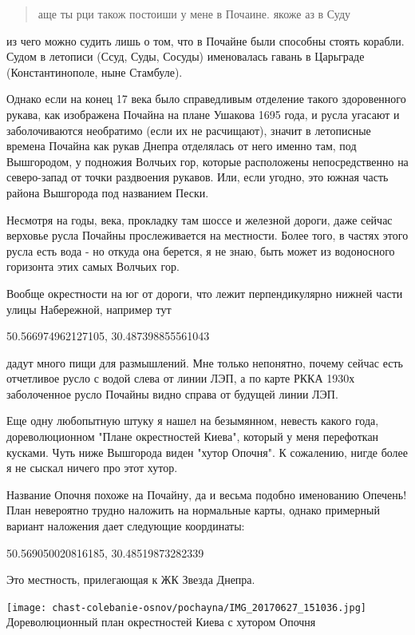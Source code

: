 \begin{quotation}
аще ты рци також постоиши у мене в Почаине. якоже аз в Суду
\end{quotation}

из чего можно судить лишь о том, что в Почайне были способны стоять корабли. Судом в летописи (Ссуд, Суды, Сосуды) именовалась гавань в Царьграде (Константинополе, ныне Стамбуле).

Однако если на конец 17 века было справедливым отделение такого здоровенного рукава, как изображена Почайна на плане Ушакова 1695 года, и русла угасают и заболочиваются необратимо (если их не расчищают), значит в летописные времена Почайна как рукав Днепра отделялась от него именно там, под Вышгородом, у подножия Волчьих гор, которые расположены непосредственно на северо-запад от точки раздвоения рукавов. Или, если угодно, это южная часть района Вышгорода под названием Пески.

Несмотря на годы, века, прокладку там шоссе и железной дороги, даже сейчас верховье русла Почайны прослеживается на местности. Более того, в частях этого русла есть вода - но откуда она берется, я не знаю, быть может из водоносного горизонта этих самых Волчьих гор. 

Вообще окрестности на юг от дороги, что лежит перпендикулярно нижней части улицы Набережной, например тут

50.566974962127105, 30.487398855561043

дадут много пищи для размышлений. Мне только непонятно, почему сейчас есть отчетливое русло с водой слева от линии ЛЭП, а по карте РККА 1930х заболоченное русло Почайны видно справа от будущей линии ЛЭП.

Еще одну любопытную штуку я нашел на безымянном, невесть какого года, дореволюционном "Плане окрестностей Киева", который у меня перефоткан кусками. Чуть ниже Вышгорода виден "хутор Опочня". К сожалению, нигде более я не сыскал ничего про этот хутор.

Название Опочня похоже на Почайну, да и весьма подобно именованию Опечень! План невероятно трудно наложить на нормальные карты, однако примерный вариант наложения дает следующие координаты:

50.569050020816185, 30.48519873282339

Это местность, прилегающая к ЖК Звезда Днепра. 

\begin{center}
\texttt{[image: chast-colebanie-osnov/pochayna/IMG\_20170627\_151036.jpg]}\\

Дореволюционный план окрестностей Киева с хутором Опочня
\end{center}

